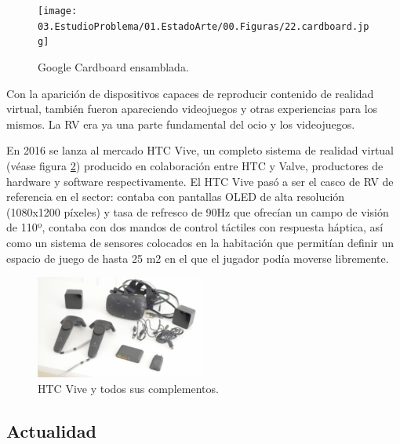 \begin{figure}
  \centering
\texttt{[image: 03.EstudioProblema/01.EstadoArte/00.Figuras/22.cardboard.jpg]}
    \caption{Google Cardboard ensamblada. \cite{EA_img_cardboard}}
    \label{fig:EA_cardboard}
\end{figure}


Con la aparición de dispositivos capaces de reproducir contenido de realidad virtual, también fueron apareciendo videojuegos y otras experiencias para los mismos. La RV era ya una parte fundamental del ocio y los videojuegos.

En 2016 se lanza al mercado HTC Vive, un completo sistema de realidad virtual (véase figura \ref{fig:EA_vive}) producido en colaboración entre HTC y Valve, productores de hardware y software respectivamente. El HTC Vive pasó a ser el casco de RV de referencia en el sector: contaba con pantallas OLED de alta resolución (1080x1200 píxeles) y tasa de refresco de 90Hz que ofrecían un campo de visión de 110º, contaba con dos mandos de control táctiles con respuesta háptica, así como un sistema de sensores colocados en la habitación que permitían definir un espacio de juego de hasta 25 m2 en el que el jugador podía moverse libremente. \cite{EA_vr_htcvive}


\begin{figure}
  \centering
\includegraphics[width=0.5\textwidth]{03.EstudioProblema/01.EstadoArte/00.Figuras/23.htc_vive.jpeg}
    \caption{HTC Vive y todos sus complementos. \cite{EA_img_vive}}
    \label{fig:EA_vive}
\end{figure}


\subsection{Actualidad}



